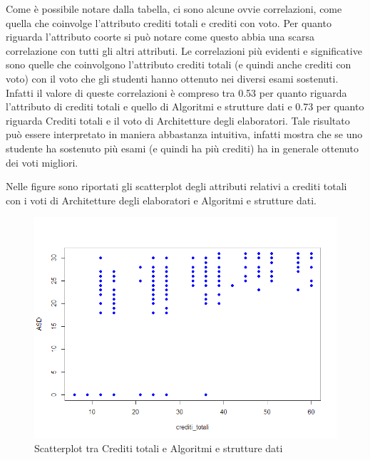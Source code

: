 \documentclass[12pt]{article}
\begin{document}
Come è possibile notare dalla tabella, ci sono alcune ovvie correlazioni, come quella che coinvolge l'attributo crediti totali e crediti con voto.
Per quanto riguarda l'attributo coorte si può notare come questo abbia una scarsa correlazione con tutti gli altri attributi.
Le correlazioni più evidenti e significative sono quelle che coinvolgono l'attributo crediti totali (e quindi anche crediti con voto) con il voto che gli studenti hanno ottenuto nei diversi esami sostenuti.
Infatti il valore di queste correlazioni è compreso tra 0.53 per quanto riguarda l'attributo di crediti totali e quello di Algori\-tmi e strutture dati e 0.73 per quanto riguarda Crediti totali e il voto di Architet\-ture degli elaboratori.
Tale risul\-tato può essere interpretato in maniera abbastanza intuitiva, infatti mostra che se uno studente ha soste\-nuto più esami (e quindi ha più crediti) ha in generale ottenuto dei voti migliori.

Nelle figure sono riportati gli scatterplot degli attributi relativi a crediti totali con i voti di Architetture degli elaboratori e Algoritmi e strutture dati.
\begin{figure}[H]
	\includegraphics[width=\textwidth]{img/creditiAsd.png}
	\caption{Scatterplot tra Crediti totali e Algoritmi e strutture dati}
\end{figure}
\end{document}
